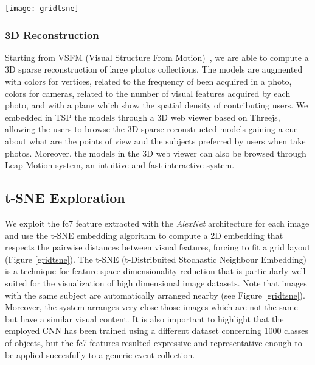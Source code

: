 \begin{figure*}
	\centering
	\texttt{[image: gridtsne]}
	\vspace{-0.3cm}
	\caption{t-SNE visualization. The images are forced to fit a grid layout. Images of an event are automatically organized by visual content. Images close in the 2D layout are also close in terms of visual content.}
	\label{gridtsne}
\end{figure*}
\subsubsection{3D Reconstruction}
Starting from VSFM (Visual Structure From Motion)~\cite{wu2013towards}, we are able to compute a 3D sparse reconstruction of large photos collections. The models are augmented with colors for vertices, related to the frequency of been acquired in a photo, colors for cameras, related to the number of visual features acquired by each photo, and with a plane which show the spatial density of contributing users. We embedded in TSP the models through a 3D web viewer based on Threejs, allowing the users to browse the 3D sparse reconstructed models gaining a cue about what are the points of view and the subjects preferred by users when take photos. Moreover, the models in the 3D web viewer can also be browsed through Leap Motion system, an intuitive and fast interactive system.
\vspace{-0.2cm}


\subsection{t-SNE Exploration}
We exploit the fc7 feature extracted with the \textit{AlexNet} architecture \cite{krizhevsky2012imagenet} for each image and use the t-SNE embedding algorithm \cite{van2008visualizing} to compute a 2D embedding that respects the pairwise distances between visual features, forcing to fit a grid layout (Figure \ref{gridtsne}). The t-SNE (t-Distribuited Stochastic Neighbour Embedding) is a technique for feature space dimensionality reduction that is particularly well suited for the visualization of high dimensional image datasets.
Note that images with the same subject are automatically arranged nearby (see Figure \ref{gridtsne}). Moreover, the system arranges very close those images which are not the same but have a similar visual content. It is also important to highlight that the employed CNN \cite{krizhevsky2012imagenet} has been trained using a different dataset concerning 1000 classes of objects, but the fc7 features resulted expressive and representative enough to be applied succesfully to a generic event collection.

